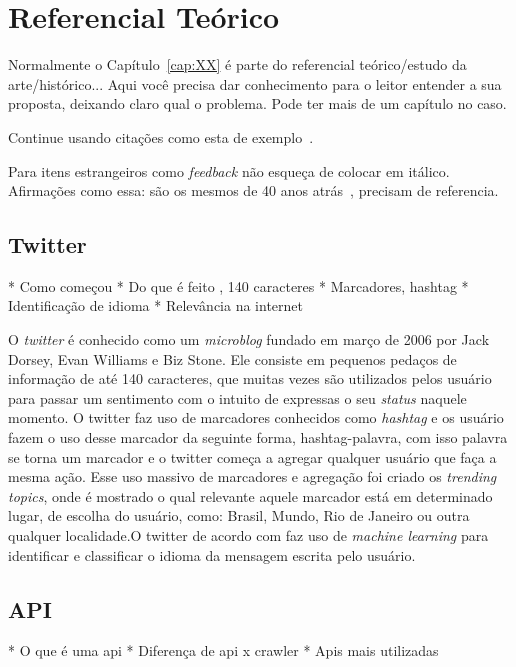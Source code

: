 \chapter{Referencial Teórico}\label{cap:referencial_teorico}

Normalmente o Capítulo~\ref{cap:XX} é parte do referencial teórico/estudo da arte/histórico... Aqui você precisa dar conhecimento para o leitor entender a sua proposta, deixando claro qual o problema. Pode ter mais de um capítulo no caso.


Continue usando citações como esta de exemplo~\cite{fangxing2010,gungor2011}.

Para itens estrangeiros como \textit{feedback}  não esqueça de colocar em itálico. Afirmações como essa: são os mesmos de 40 anos atrás~\cite{gungor2011}, precisam de referencia. 

\section{Twitter}\label{sec:twitter}

* Como começou
* Do que é feito , 140 caracteres
* Marcadores, hashtag
* Identificação de idioma
* Relevância na internet

O \textit{twitter} é conhecido como um \textit{microblog} fundado em março de 2006 por Jack Dorsey, Evan Williams e Biz Stone. Ele consiste em pequenos pedaços de informação de até 140 caracteres, que muitas vezes são utilizados pelos usuário para passar um sentimento com o intuito de expressas o seu \textit{status} naquele momento. O twitter faz uso de marcadores conhecidos como \textit{hashtag}
e os usuário fazem o uso desse marcador da seguinte forma, hashtag-palavra, com isso palavra se torna um marcador e o twitter começa a agregar qualquer usuário que faça a mesma ação. Esse uso massivo de marcadores e agregação foi criado os \textit{trending topics}, onde é mostrado o qual relevante aquele marcador está em determinado lugar, de escolha do usuário, como: Brasil, Mundo, Rio de Janeiro ou outra qualquer localidade.O twitter de acordo com \cite{arneromannkurrik2013} faz uso de \textit{machine learning} para identificar e classificar o idioma da mensagem escrita pelo usuário.


\section{API}\label{sec:api}
* O que é uma api
* Diferença de api x crawler
* Apis mais utilizadas

